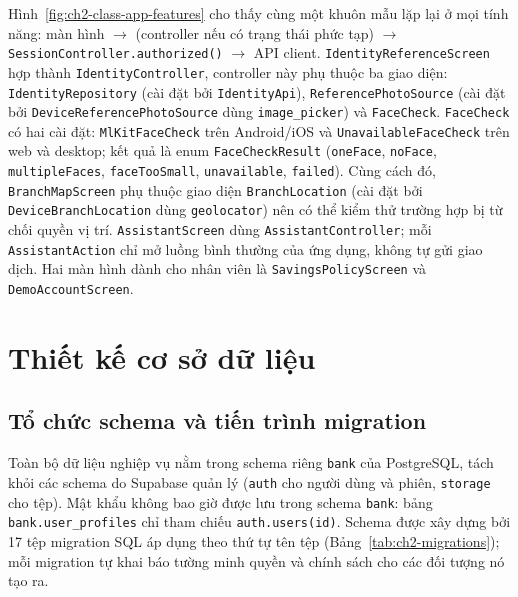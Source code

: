 Hình~\ref{fig:ch2-class-app-features} cho thấy cùng một khuôn mẫu lặp lại ở mọi tính năng: màn hình $\rightarrow$ (controller nếu có trạng thái phức tạp) $\rightarrow$ \texttt{Session\allowbreak{}Controller.\allowbreak{}authorized()} $\rightarrow$ API client. \texttt{Identity\allowbreak{}Reference\allowbreak{}Screen} hợp thành \texttt{Identity\allowbreak{}Controller}, controller này phụ thuộc ba giao diện: \texttt{Identity\allowbreak{}Repository} (cài đặt bởi \texttt{IdentityApi}), \texttt{Reference\allowbreak{}Photo\allowbreak{}Source} (cài đặt bởi \texttt{Device\allowbreak{}Reference\allowbreak{}Photo\allowbreak{}Source} dùng \texttt{image\_\allowbreak{}picker}) và \texttt{FaceCheck}. \texttt{FaceCheck} có hai cài đặt: \texttt{Ml\allowbreak{}Kit\allowbreak{}Face\allowbreak{}Check} trên Android/iOS và \texttt{Unavailable\allowbreak{}Face\allowbreak{}Check} trên web và desktop; kết quả là enum \texttt{Face\allowbreak{}Check\allowbreak{}Result} (\texttt{oneFace}, \texttt{noFace}, \texttt{multipleFaces}, \texttt{faceTooSmall}, \texttt{unavailable}, \texttt{failed}). Cùng cách đó, \texttt{Branch\allowbreak{}Map\allowbreak{}Screen} phụ thuộc giao diện \texttt{Branch\allowbreak{}Location} (cài đặt bởi \texttt{Device\allowbreak{}Branch\allowbreak{}Location} dùng \texttt{geolocator}) nên có thể kiểm thử trường hợp bị từ chối quyền vị trí. \texttt{Assistant\allowbreak{}Screen} dùng \texttt{Assistant\allowbreak{}Controller}; mỗi \texttt{Assistant\allowbreak{}Action} chỉ mở luồng bình thường của ứng dụng, không tự gửi giao dịch. Hai màn hình dành cho nhân viên là \texttt{Savings\allowbreak{}Policy\allowbreak{}Screen} và \texttt{Demo\allowbreak{}Account\allowbreak{}Screen}.

\section{Thiết kế cơ sở dữ liệu}
\label{sec:ch2-database}

\subsection{Tổ chức schema và tiến trình migration}
\label{sec:ch2-migrations}

Toàn bộ dữ liệu nghiệp vụ nằm trong schema riêng \texttt{bank} của PostgreSQL, tách khỏi các schema do Supabase quản lý (\texttt{auth} cho người dùng và phiên, \texttt{storage} cho tệp). Mật khẩu không bao giờ được lưu trong schema \texttt{bank}: bảng \texttt{bank.\allowbreak{}user\_\allowbreak{}profiles} chỉ tham chiếu \texttt{auth.\allowbreak{}users(id)}. Schema được xây dựng bởi 17 tệp migration SQL áp dụng theo thứ tự tên tệp (Bảng~\ref{tab:ch2-migrations}); mỗi migration tự khai báo tường minh quyền và chính sách cho các đối tượng nó tạo ra.

